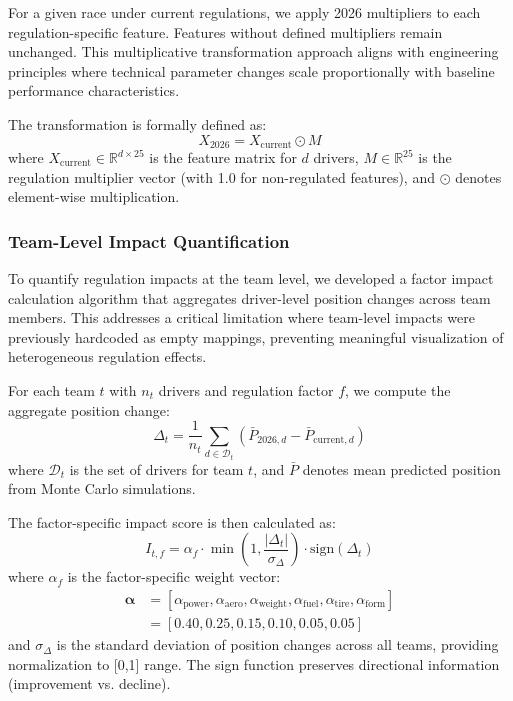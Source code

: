 \documentclass[conference]{IEEEtran}
\begin{document}
For a given race under current regulations, we apply 2026 multipliers to each regulation-specific feature. Features without defined multipliers remain unchanged. This multiplicative transformation approach aligns with engineering principles where technical parameter changes scale proportionally with baseline performance characteristics.

The transformation is formally defined as:
\begin{equation}
X_{\text{2026}} = X_{\text{current}} \odot M
\end{equation}
where $X_{\text{current}} \in \mathbb{R}^{d \times 25}$ is the feature matrix for $d$ drivers, $M \in \mathbb{R}^{25}$ is the regulation multiplier vector (with 1.0 for non-regulated features), and $\odot$ denotes element-wise multiplication.

\subsubsection{Team-Level Impact Quantification}

To quantify regulation impacts at the team level, we developed a factor impact calculation algorithm that aggregates driver-level position changes across team members. This addresses a critical limitation where team-level impacts were previously hardcoded as empty mappings, preventing meaningful visualization of heterogeneous regulation effects.

For each team $t$ with $n_t$ drivers and regulation factor $f$, we compute the aggregate position change:
\begin{equation}
\Delta_t = \frac{1}{n_t} \sum_{d \in \mathcal{D}_t} \left(\bar{P}_{\text{2026},d} - \bar{P}_{\text{current},d}\right)
\end{equation}
where $\mathcal{D}_t$ is the set of drivers for team $t$, and $\bar{P}$ denotes mean predicted position from Monte Carlo simulations.

The factor-specific impact score is then calculated as:
\begin{equation}
I_{t,f} = \alpha_f \cdot \min\left(1, \frac{|\Delta_t|}{\sigma_{\Delta}}\right) \cdot \text{sign}(\Delta_t)
\end{equation}
where $\alpha_f$ is the factor-specific weight vector:
\begin{align}
\boldsymbol{\alpha} &= [\alpha_{\text{power}}, \alpha_{\text{aero}}, \alpha_{\text{weight}}, \alpha_{\text{fuel}}, \alpha_{\text{tire}}, \alpha_{\text{form}}] \\
&= [0.40, 0.25, 0.15, 0.10, 0.05, 0.05]
\end{align}
and $\sigma_{\Delta}$ is the standard deviation of position changes across all teams, providing normalization to [0,1] range. The sign function preserves directional information (improvement vs. decline).
\end{document}

